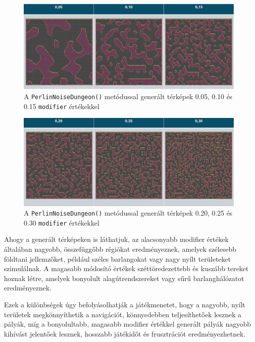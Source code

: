 \begin{figure}[ht]
\centering
\includegraphics[width=\textwidth]{images/lowmodifierperlin.png}
\caption{ A \texttt{PerlinNoiseDungeon()} metódussal generált térképek 0.05, 0.10 és 0.15 \texttt{modifier} értékekkel}
\label{fig:lowmodifyperlin}
\end{figure}

\begin{figure}[ht]
\centering
\includegraphics[width=\textwidth]{images/highmodifierperlin.png}
\caption{ A \texttt{PerlinNoiseDungeon()} metódussal generált térképek 0.20, 0.25 és 0.30 \texttt{modifier} értékekkel}
\label{fig:highmodifyperlin}
\end{figure}


Ahogy a generált térképeken is láthatjuk, az alacsonyabb modifier értékek általában nagyobb, összefüggőbb régiókat eredményeznek, amelyek szélesebb földtani jellemzőket, például széles barlangokat vagy nagy nyílt területeket szimulálnak. A magasabb módosító értékek széttöredezettebb és kuszább tereket hoznak létre, amelyek bonyolult alagútrendszereket vagy sűrű barlanghálózatot eredményeznek.

Ezek a különbségek úgy befolyásolhatják a játékmenetet, hogy a nagyobb, nyílt területek megkönnyíthetik a navigációt, könnyedebben teljesíthetőek lesznek a pályák, míg a bonyolultabb, magasabb modifier értékkel generált pályák nagyobb kihívást jelentőek lesznek, hosszabb játékidőt és frusztrációt eredményezhetnek.


